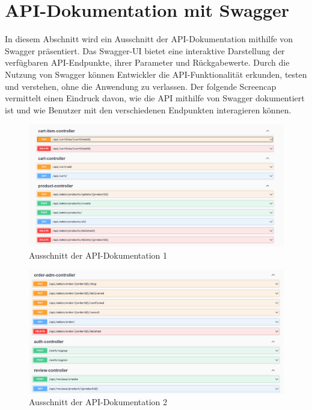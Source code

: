 \section{API-Dokumentation mit Swagger}
In diesem Abschnitt wird ein Ausschnitt der API-Dokumentation mithilfe von Swagger präsentiert. Das Swagger-UI bietet eine interaktive Darstellung der verfügbaren API-Endpunkte, ihrer Parameter und Rückgabewerte. Durch die Nutzung von Swagger können Entwickler die API-Funktionalität erkunden, testen und verstehen, ohne die Anwendung zu verlassen. Der folgende Screencap vermittelt einen Eindruck davon, wie die API mithilfe von Swagger dokumentiert ist und wie Benutzer mit den verschiedenen Endpunkten interagieren können.
\begin{figure}[H]
	\includegraphics[width=17cm]{swagger1.png}
	\caption{Ausschnitt der API-Dokumentation 1 }
	\label{fig:swg1}
\end{figure}
\begin{figure}[H]
	\includegraphics[width=17cm]{swagger2.png}
	\caption{Ausschnitt der API-Dokumentation 2 }
	\label{fig:swg2}
\end{figure}
